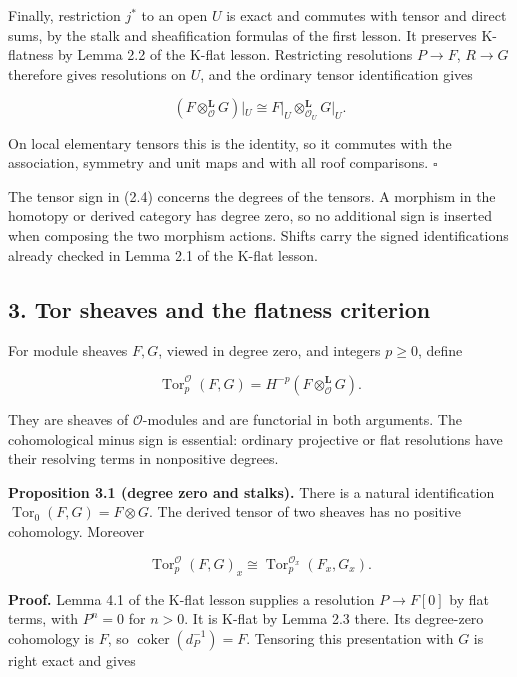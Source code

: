 \documentclass[
  english,
  11pt,
  a4paper,
]{article}
\begin{document}
Finally, restriction \(j^*\) to an open \(U\) is exact and commutes with
tensor and direct sums, by the stalk and sheafification formulas of the
first lesson. It preserves K-flatness by Lemma 2.2 of the K-flat lesson.
Restricting resolutions \(P\to F\), \(R\to G\) therefore gives
resolutions on \(U\), and the ordinary tensor identification gives

\[(F\otimes_{\mathcal O}^{\mathbf L}G)|_U
\cong F|_U\otimes_{\mathcal O_U}^{\mathbf L}G|_U.
\tag{2.5}\]

On local elementary tensors this is the identity, so it commutes with
the association, symmetry and unit maps and with all roof comparisons.
\(\square\)

The tensor sign in (2.4) concerns the degrees of the tensors. A morphism
in the homotopy or derived category has degree zero, so no additional
sign is inserted when composing the two morphism actions. Shifts carry
the signed identifications already checked in Lemma 2.1 of the K-flat
lesson.

\subsection{3. Tor sheaves and the flatness
criterion}\label{derived-tensor-products-and-tor-sheaves--3-tor-sheaves-and-the-flatness-criterion}

For module sheaves \(F,G\), viewed in degree zero, and integers
\(p\ge0\), define

\[\operatorname{Tor}^{\mathcal O}_p(F,G)
=H^{-p}(F\otimes_{\mathcal O}^{\mathbf L}G).
\tag{3.1}\]

They are sheaves of \(\mathcal O\)-modules and are functorial in both
arguments. The cohomological minus sign is essential: ordinary
projective or flat resolutions have their resolving terms in nonpositive
degrees.

\textbf{Proposition 3.1 (degree zero and stalks).} There is a natural
identification \(\operatorname{Tor}_0(F,G)=F\otimes G\). The derived
tensor of two sheaves has no positive cohomology. Moreover

\[\operatorname{Tor}^{\mathcal O}_p(F,G)_x
\cong\operatorname{Tor}^{\mathcal O_x}_p(F_x,G_x).
\tag{3.2}\]

\textbf{Proof.} Lemma 4.1 of the K-flat lesson supplies a resolution
\(P\to F[0]\) by flat terms, with \(P^n=0\) for \(n>0\). It is K-flat by
Lemma 2.3 there. Its degree-zero cohomology is \(F\), so
\(\operatorname{coker}(d_P^{-1})=F\). Tensoring this presentation with
\(G\) is right exact and gives
\end{document}
